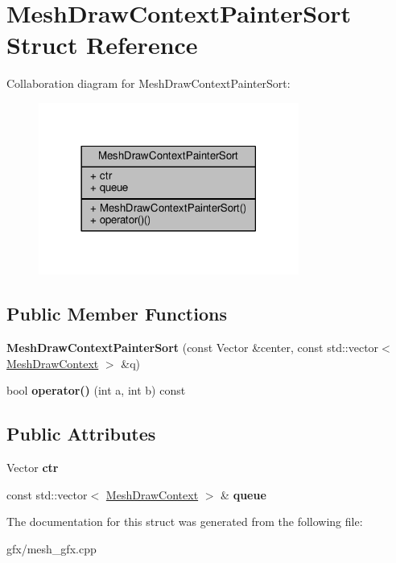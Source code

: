 \hypertarget{structMeshDrawContextPainterSort}{}\section{Mesh\+Draw\+Context\+Painter\+Sort Struct Reference}
\label{structMeshDrawContextPainterSort}


Collaboration diagram for Mesh\+Draw\+Context\+Painter\+Sort\+:
\nopagebreak
\begin{figure}[H]
\begin{center}
\leavevmode
\includegraphics[width=242pt]{d7/df2/structMeshDrawContextPainterSort__coll__graph}
\end{center}
\end{figure}
\subsection*{Public Member Functions}
\begin{DoxyCompactItemize}
\item 
{\bfseries Mesh\+Draw\+Context\+Painter\+Sort} (const Vector \&center, const std\+::vector$<$ \hyperlink{structMeshDrawContext}{Mesh\+Draw\+Context} $>$ \&q)\hypertarget{structMeshDrawContextPainterSort_a1c9a934c265f4572393c5be7ce9e6594}{}\label{structMeshDrawContextPainterSort_a1c9a934c265f4572393c5be7ce9e6594}

\item 
bool {\bfseries operator()} (int a, int b) const \hypertarget{structMeshDrawContextPainterSort_a6b172e9197f732bfe0d96c52ea3aa619}{}\label{structMeshDrawContextPainterSort_a6b172e9197f732bfe0d96c52ea3aa619}

\end{DoxyCompactItemize}
\subsection*{Public Attributes}
\begin{DoxyCompactItemize}
\item 
Vector {\bfseries ctr}\hypertarget{structMeshDrawContextPainterSort_aa7fdb3ba942f2c16ad786c75723fe690}{}\label{structMeshDrawContextPainterSort_aa7fdb3ba942f2c16ad786c75723fe690}

\item 
const std\+::vector$<$ \hyperlink{structMeshDrawContext}{Mesh\+Draw\+Context} $>$ \& {\bfseries queue}\hypertarget{structMeshDrawContextPainterSort_af4be7b977829885e2030c0d03c80e45e}{}\label{structMeshDrawContextPainterSort_af4be7b977829885e2030c0d03c80e45e}

\end{DoxyCompactItemize}


The documentation for this struct was generated from the following file\+:\begin{DoxyCompactItemize}
\item 
gfx/mesh\+\_\+gfx.\+cpp\end{DoxyCompactItemize}

